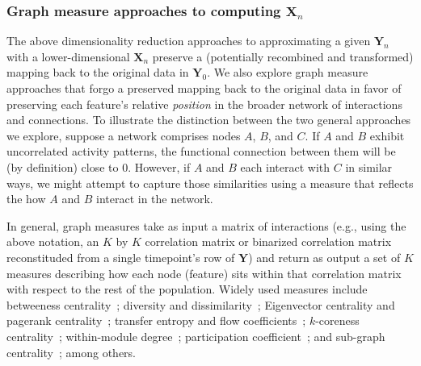 \documentclass[english]{article}
\begin{document}
\subsubsection*{Graph measure approaches to computing
  $\mathbf{X}_n$}
The above dimensionality reduction approaches to approximating a given
$\mathbf{Y}_n$ with a lower-dimensional $\mathbf{X}_n$ preserve a
(potentially recombined and transformed) mapping back to the original
data in $\mathbf{Y}_0$.  We also explore graph measure approaches
that forgo a preserved mapping back to the original data in favor of
preserving each feature's relative \textit{position} in the broader
network of interactions and connections.  To illustrate the
distinction between the two general approaches we explore, suppose a
network comprises nodes $A$, $B$, and $C$.  If $A$ and $B$ exhibit
uncorrelated activity patterns, the functional connection between
them will be (by definition) close to 0.  However, if $A$ and $B$ each
interact with $C$ in similar ways, we might attempt to capture those
similarities using a measure that reflects the how $A$ and $B$
interact in the network.

In general, graph measures take as input a matrix of
interactions (e.g., using the above notation, an $K$ by $K$
correlation matrix or binarized correlation matrix reconstituded from
a single timepoint's row of $\mathbf{Y}$) and return as output a set
of $K$ measures describing how each node (feature) sits within that
correlation matrix with respect to the rest of the population.  Widely
used measures include betweeness centrality~\citep[the proportion of
shortest paths between each pair of nodes in the population that
involves the given node in question; e.g., ][]{Newm05, OpsaEtal10,
  Bart04, GeisEtal08, Free77}; diversity and
dissimilarity~\citep[characterizations of how differently connected a
given node is from others in the population; e.g., ][]{Rao82, Lin09,
  RicoSzei06}; Eigenvector centrality and pagerank
centrality~\citep[measures of how influential a given node is within
the broader network; e.g., ][]{Newm08, Bona07, LohmEtal10,
  HaluEtal13}; transfer entropy and flow coefficients~\citep[a measure
of how much information is flowing from a given node to other nodes in
the network; e.g., ][]{HoneEtal07, Schr00}; $k$-coreness
centrality~\citep[a measure of the connectivity of a node within its
local sub-graph; e.g., ][]{AlvaEtal05, ChriFowl10}; within-module
degree~\citep[a measure of how many connections a node has to its
close neighbors in the network; e.g., ][]{RubiSpor10}; participation
coefficient~\citep[a measure of the diversity of a node's connections
to different sub-graphs in the network; e.g., ][]{RubiSpor10}; and
sub-graph centrality~\citep[a measure of a node's participation in all
of the network's sub-graphs; e.g., ][]{EstrRodr05}; among others.
\end{document}
